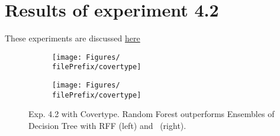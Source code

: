 
\newcommand{\major}{4}
\newcommand{\minor}{2}

\newcommand{\undPrefix}{\major_\minor}
\newcommand{\dotPrefix}{\major.\minor}
\newcommand{\scoPrefix}{\major-\minor}
\newcommand{\filePrefix}{\undPrefix/rff}

\chapter{Results of experiment \dotPrefix} %


\label{Appendix\scoPrefix} %

These experiments are discussed \hyperref[disc:h4]{here}



\begin{figure}[H]
  \centering
  \renewcommand{\filePrefix}{\undPrefix/rff}
  \begin{subfigure}[t]{0.5\linewidth}
    \centering\captionsetup{width=.8\linewidth}\texttt{[image: Figures/\\filePrefix/covertype]}
    \label{fig:\undPrefix_covertype}
  \end{subfigure}%
  \renewcommand{\filePrefix}{\undPrefix/nys}%
  \begin{subfigure}[t]{0.5\linewidth}
    \centering\captionsetup{width=.8\linewidth}\texttt{[image: Figures/\\filePrefix/covertype]}
    \label{fig:\undPrefix_covertype}
  \end{subfigure}%
  \caption*{Exp. 4.2 with Covertype. Random Forest outperforms Ensembles of
  Decision Tree with RFF (left) and \Nys\ (right).}
\end{figure}


